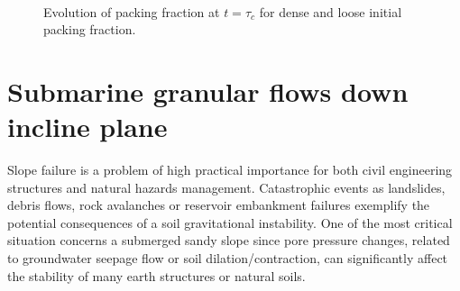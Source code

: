 \begin{figure}
\centering
{}\\
\caption{Evolution of packing fraction at $t = \tau_c$ for dense and loose 
initial packing fraction.}
\label{fig:Dense_Loose_voro}
\end{figure}

\clearpage


\section{Submarine granular flows down incline plane}

Slope failure is a problem of high practical importance for both civil 
engineering structures and natural hazards management. Catastrophic events as 
landslides, debris flows, rock avalanches or reservoir embankment failures 
exemplify the potential consequences of a soil gravitational instability. One 
of the most critical situation concerns a submerged sandy slope since pore 
pressure changes, related to groundwater seepage flow or soil 
dilation/contraction, can significantly affect the stability of many earth 
structures or natural soils.

